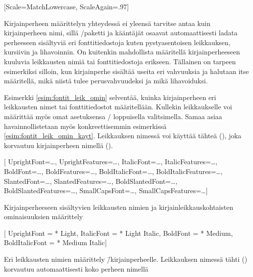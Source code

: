 \begin{koodilohkosis}
\setmonofont{TeX Gyre Cursor}
[Scale=MatchLowercase, ScaleAgain=.97]
\end{koodilohkosis}

Kirjainperheen määrittelyn yhteydessä ei yleensä tarvitse antaa kuin
kirjainperheen nimi, sillä \-/paketti ja kääntäjät
osaavat automaattisesti ladata perheeseen sisältyviä eri
fonttitiedostoja kuten pystyasentoisen leikkauksen, kursiivin ja
lihavoinnin. On kuitenkin mahdollista määritellä kirjainperheeseen
kuuluvia leikkausten nimiä tai fonttitiedostoja erikseen. Tällainen on
tarpeen esimerkiksi silloin, kun kirjainperhe sisältää useita eri
vahvuuksia ja halutaan itse määritellä, mikä niistä tulee
perusvahvuudeksi ja mikä lihavoiduksi.

Esimerkki \ref{esim:fontit_leik_omin} selventää, kuinka kirjainperheen
eri leikkausten nimet tai fonttitiedostot määritellään. Kullekin
leikkaukselle voi määrittää myös omat asetuksensa \-/
loppuisella valitsimella. Samaa asiaa havainnollistetaan myös
konkreettisemmin esimerkissä \ref{esim:fontit_leik_omin_kayt}.
Leikkauksen nimessä voi käyttää tähteä (\koodi{*}), joka korvautuu
kirjainperheen nimellä ().

\begin{esimerkki*}
\begin{koodilohko}
\setmainfont{…}[
  UprightFont={…},     UprightFeatures={…},
  ItalicFont={…},      ItalicFeatures={…},
  BoldFont={…},        BoldFeatures={…},
  BoldItalicFont={…},  BoldItalicFeatures={…},
  SlantedFont={…},     SlantedFeatures={…},
  BoldSlantedFont={…}, BoldSlantedFeatures={…},
  SmallCapsFont={…},   SmallCapsFeatures={…}]
\end{koodilohko}
  \caption{Kirjainperheeseen sisältyvien leikkausten nimien ja
    kirjainleikkauskohtaisten ominaisuuksien määrittely}
  \label{esim:fontit_leik_omin}
\end{esimerkki*}

\begin{esimerkki*}
\begin{koodilohko}
\setmainfont{Macklin Text}[
  UprightFont    = {* Light},
  ItalicFont     = {* Light Italic},
  BoldFont       = {* Medium},
  BoldItalicFont = {* Medium Italic}]
\end{koodilohko}
  \caption{Eri leikkausten nimien määrittely 
    \=/kirjainperheelle. Leikkauksen nimessä tähti (\koodi{*}) korvautuu
    automaattisesti koko perheen nimellä}
  \label{esim:fontit_leik_omin_kayt}
\end{esimerkki*}

